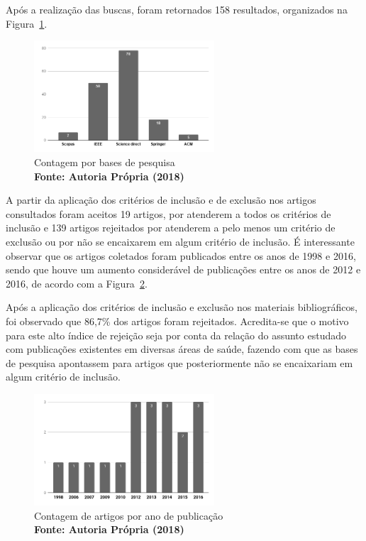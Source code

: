 Após a realização das buscas, foram retornados 158 resultados, organizados na Figura~\ref{bases}. 

\begin{figure}[ht]
\begin{center}
\includegraphics[width=0.6\textwidth]{base_de_dados_de_origem.png}
\caption{Contagem por bases de pesquisa \label{bases} \\ \textbf{\footnotesize Fonte: Autoria Própria (2018)}}
\end{center}
\end{figure}


A partir da aplicação dos critérios de inclusão e de exclusão nos artigos consultados foram aceitos 19 artigos, por atenderem a todos os critérios de inclusão e 139 artigos rejeitados por atenderem a pelo menos um critério de exclusão ou por não se encaixarem em algum critério de inclusão. É interessante observar que os artigos coletados foram publicados entre os anos de 1998 e 2016, sendo que houve um aumento considerável de publicações entre os anos de 2012 e 2016, de acordo com a Figura~\ref{ano}.
 
Após a aplicação dos critérios de inclusão e exclusão nos materiais bibliográficos, foi observado que 86,7\%  dos artigos foram rejeitados. Acredita-se que o motivo para este alto índice de rejeição seja por conta da relação do assunto estudado com publicações existentes em diversas áreas de saúde, fazendo com que as bases de pesquisa apontassem para artigos que posteriormente não se encaixariam em algum critério de inclusão. 

\begin{figure}[!h]
\begin{center}
\includegraphics[width=0.6\textwidth]{contagem_por_ano.png}
\caption{Contagem de artigos por ano de publicação 
\\ \textbf{\footnotesize Fonte: Autoria Própria (2018)}}
\label{ano}
\end{center}
\end{figure}


